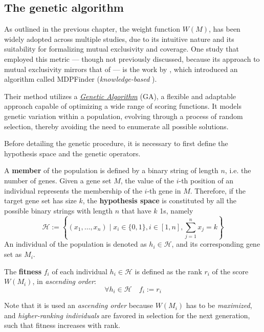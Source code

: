 \subsection{The genetic algorithm}

As outlined in the previous chapter, the weight function $W(M)$, has been widely adopted across multiple studies, due to its intuitive nature and its suitability for formalizing mutual exclusivity and coverage. One study that employed this metric --- though not previously discussed, because its approach to mutual exclusivity mirrors that of \textcite{dendrix} --- is the work by \textcite{mdpfinder}, which introduced an algorithm called MDPFinder (\textit{knowledge-based} \cite{survey}).

Their method utilizes a \href{https://en.wikipedia.org/wiki/Genetic_algorithm}{\textit{Genetic Algorithm}} (GA), a flexible and adaptable approach capable of optimizing a wide range of scoring functions. It models genetic variation within a population, evolving through a process of random selection, thereby avoiding the need to enumerate all possible solutions.

Before detailing the genetic procedure, it is necessary to first define the hypothesis space and the genetic operators.

\begin{definition}
    A \textbf{member} of the population is defined by a binary string of length $n$, i.e. the number of genes. Given a gene set $M$, the value of the $i$-th position of an individual represents the membership of the $i$-th gene in $M$. Therefore, if the target gene set has size $k$, the \textbf{hypothesis space} is constituted by all the possible binary strings with length $n$ that have $k$ 1s, namely $$\mathcal H := \left\{(x_1, \ldots, x_n) \mid x_i \in \{0, 1\}, i \in [1, n], \sum_{j = 1}^n {x_j} = k \right\}$$ An individual of the population is denoted as $h_i \in \mathcal H$, and its corresponding gene set as $M_i$.
\end{definition}

\begin{definition}
    The \textbf{fitness} $f_i$ of each individual $h_i \in \mathcal H$ is defined as the rank $r_i$ of the score $W(M_i)$, in \textit{ascending order}: $$\forall h_i \in \mathcal H \quad f_i := r_i$$
\end{definition}

Note that it is used an \textit{ascending order} because $W(M_i)$ has to be \textit{maximized}, and \textit{higher-ranking individuals} are favored in selection for the next generation, such that fitness increases with rank.

